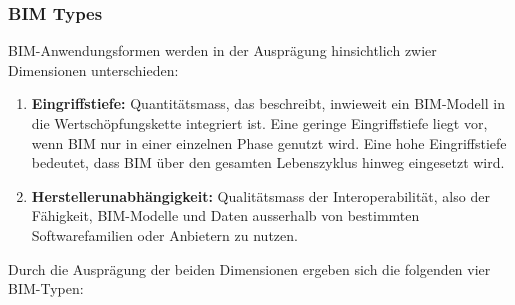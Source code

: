 \begin{table}[h]
    \centering
    \renewcommand{\arraystretch}{1.2} %
    \setlength{\tabcolsep}{5pt} %
    \caption{BIM Dimensions and Information Depth}
    \label{tab:BIM_dimensions}
\end{table}

\subsubsection{BIM Types}
\begin{German}
    BIM-Anwendungsformen werden in der Ausprägung hinsichtlich zwier Dimensionen unterschieden: \cite{astourLehrbuchGrundlagenBIMArbeitsmethode2022}
    
    \begin{enumerate}
        \item \textbf{Eingriffstiefe:} Quantitätsmass, das beschreibt, inwieweit ein BIM-Modell in die Wertschöpfungskette integriert ist. Eine geringe Eingriffstiefe liegt vor, wenn BIM nur in einer einzelnen Phase genutzt wird. Eine hohe Eingriffstiefe bedeutet, dass BIM über den gesamten Lebenszyklus hinweg eingesetzt wird.
        \item \textbf{Herstellerunabhängigkeit:} Qualitätsmass der Interoperabilität, also der Fähigkeit, BIM-Modelle und Daten ausserhalb von bestimmten Softwarefamilien oder Anbietern zu nutzen.
    \end{enumerate}

    Durch die Ausprägung der beiden Dimensionen ergeben sich die folgenden vier BIM-Typen: 
\end{German}

